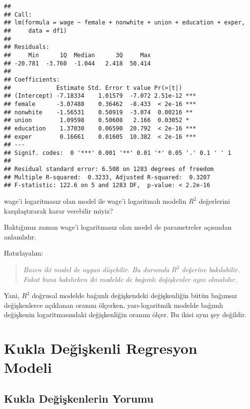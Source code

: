 \documentclass[
]{book}
\begin{document}
\begin{verbatim}
## 
## Call:
## lm(formula = wage ~ female + nonwhite + union + education + exper, 
##     data = df1)
## 
## Residuals:
##     Min      1Q  Median      3Q     Max 
## -20.781  -3.760  -1.044   2.418  50.414 
## 
## Coefficients:
##             Estimate Std. Error t value Pr(>|t|)    
## (Intercept) -7.18334    1.01579  -7.072 2.51e-12 ***
## female      -3.07488    0.36462  -8.433  < 2e-16 ***
## nonwhite    -1.56531    0.50919  -3.074  0.00216 ** 
## union        1.09598    0.50608   2.166  0.03052 *  
## education    1.37030    0.06590  20.792  < 2e-16 ***
## exper        0.16661    0.01605  10.382  < 2e-16 ***
## ---
## Signif. codes:  0 '***' 0.001 '**' 0.01 '*' 0.05 '.' 0.1 ' ' 1
## 
## Residual standard error: 6.508 on 1283 degrees of freedom
## Multiple R-squared:  0.3233, Adjusted R-squared:  0.3207 
## F-statistic: 122.6 on 5 and 1283 DF,  p-value: < 2.2e-16
\end{verbatim}

wage'i logaritmasız olan model ile wage'i logaritmalı modelin \(R^2\) değerlerini karşılaştırarak karar verebilir miyiz?

Baktığımız zaman wage'i logaritmasız olan model de parametreler açısından anlamlıdır.

Hatırlayalım:

\begin{quote}
\emph{Bazen iki model de uygun düşebilir. Bu durumda} \(R^2\) \emph{değerine bakılabilir. Fakat buna bakılırken iki modelde de bağımlı değişkenler aynı olmalıdır.}
\end{quote}

Yani, \(R^2\) doğrusal modelde bağımlı değişkendeki değişkenliğin bütün bağımsız değişkenlerce açıklanan oranını ölçerken, yarı-logaritmik modelde bağımlı değişkenin logaritmasındaki değişkenliğin oranını ölçer. Bu ikisi aynı şey değildir.

\hypertarget{kukla-deux11fiux15fkenli-regresyon-modeli}{%
\chapter{Kukla Değişkenli Regresyon Modeli}\label{kukla-deux11fiux15fkenli-regresyon-modeli}}

\hypertarget{kukla-deux11fiux15fkenlerin-yorumu}{%
\section{Kukla Değişkenlerin Yorumu}\label{kukla-deux11fiux15fkenlerin-yorumu}}
\end{document}
